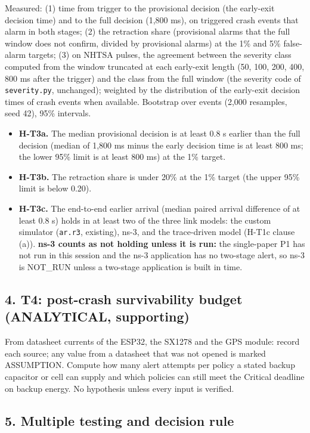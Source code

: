 Measured: (1) time from trigger to the provisional decision (the early-exit decision time) and to the full decision (1,800 ms), on triggered crash events that alarm in both stages; (2) the retraction share (provisional alarms that the full window does not confirm, divided by provisional alarms) at the 1\% and 5\% false-alarm targets; (3) on NHTSA pulses, the agreement between the severity class computed from the window truncated at each early-exit length (50, 100, 200, 400, 800 ms after the trigger) and the class from the full window (the severity code of \texttt{severity.py}, unchanged); weighted by the distribution of the early-exit decision times of crash events when available. Bootstrap over events (2,000 resamples, seed 42), 95\% intervals.

\begin{itemize}
\item \textbf{H-T3a.} The median provisional decision is at least 0.8 s earlier than the full decision (median of 1,800 ms minus the early decision time is at least 800 ms; the lower 95\% limit is at least 800 ms) at the 1\% target.
\item \textbf{H-T3b.} The retraction share is under 20\% at the 1\% target (the upper 95\% limit is below 0.20).
\item \textbf{H-T3c.} The end-to-end earlier arrival (median paired arrival difference of at least 0.8 s) holds in at least two of the three link models: the custom simulator (\texttt{ar.r3}, existing), ns-3, and the trace-driven model (H-T1c clause (a)). \textbf{ns-3 counts as not holding unless it is run:} the single-paper P1 has not run in this session and the ns-3 application has no two-stage alert, so ns-3 is NOT\_RUN unless a two-stage application is built in time.
\end{itemize}

\subsection*{4. T4: post-crash survivability budget (ANALYTICAL, supporting)}

From datasheet currents of the ESP32, the SX1278 and the GPS module: record each source; any value from a datasheet that was not opened is marked ASSUMPTION. Compute how many alert attempts per policy a stated backup capacitor or cell can supply and which policies can still meet the Critical deadline on backup energy. No hypothesis unless every input is verified.

\subsection*{5. Multiple testing and decision rule}

